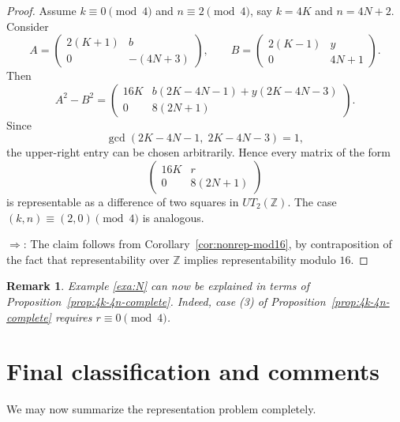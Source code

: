 \documentclass[11pt]{amsart}
\newtheorem{remark}{Remark}
\def\Z{\mathbb{Z}}
\begin{document}
\begin{proof}
Assume $k\equiv 0 \pmod 4$ and $n\equiv 2 \pmod 4$, say $k=4K$ and $n=4N+2$. Consider
$$A=\begin{pmatrix}2(K+1)&b\\0&-(4N+3)\end{pmatrix},\qquad
B=\begin{pmatrix}2(K-1)&y\\0&4N+1\end{pmatrix}.$$
Then
$$A^2-B^2=\begin{pmatrix}
16K &
b(2K-4N-1)+y(2K-4N-3)\\0 &8(2N+1)\end{pmatrix}.$$
Since
$$\gcd(2K-4N-1,\;2K-4N-3)=1,$$
the upper-right entry can be chosen arbitrarily. Hence every matrix of the form
$$\begin{pmatrix}
16K&r\\0&8(2N+1)
\end{pmatrix}$$
is representable as a difference of two squares in $UT_2(\mathbb Z)$. The case $(k,n)\equiv(2,0)\pmod 4$ is analogous.


$\boxed{\Rightarrow}$:
The claim follows from Corollary~\ref{cor:nonrep-mod16}, by contraposition of the fact that representability over $\mathbb Z$ implies representability modulo $16$.
\end{proof}


\begin{remark}
Example \ref{exa:N}  can now be explained in terms of Proposition~\ref{prop:4k-4n-complete}. Indeed,  case (3) of Proposition~\ref{prop:4k-4n-complete} requires $r\equiv0\pmod4$.
\end{remark}

\section{Final classification and comments}

We may now summarize the representation problem completely.
\end{document}
